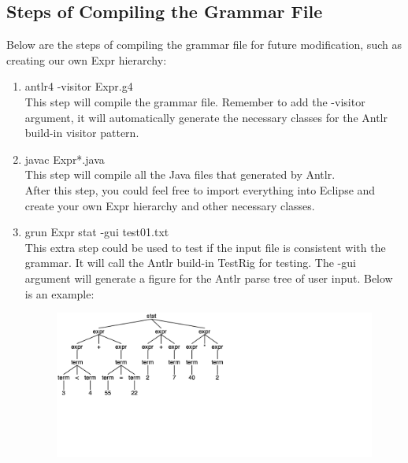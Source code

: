 \documentclass[a4paper,12pt,titlepage]{article}
\begin{document}
\subsection{Steps of Compiling the Grammar File}
Below are the steps of compiling the grammar file for future modification, such as creating our own Expr hierarchy:
\begin{enumerate}
  \item {\footnotesize\ttfamily antlr4 -visitor Expr.g4} \\
  	This step will compile the grammar file. Remember to add the {\footnotesize\ttfamily -visitor} argument, it will automatically generate the necessary classes for the Antlr build-in visitor pattern.
	\item {\footnotesize\ttfamily javac Expr*.java} \\
	This step will compile all the Java files that generated by Antlr. \\
	After this step, you could feel free to import everything into Eclipse and create your own Expr hierarchy and other necessary classes.
	\item {\footnotesize\ttfamily grun Expr stat -gui test01.txt} \\
	This extra step could be used to test if the input file is consistent with the grammar. It will call the Antlr build-in TestRig for testing.
	The {-gui} argument will generate a figure for the Antlr parse tree of user input. Below is an example:
		\begin{figure}[H]
		\centering
		\includegraphics[width=\linewidth]{antlr4_parse_tree.png}
		\end{figure}
\end{enumerate}




\end{document}
